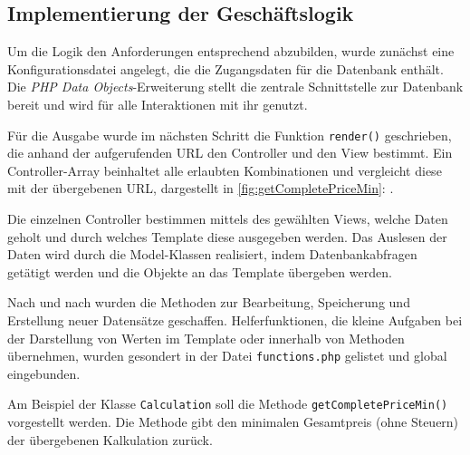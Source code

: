 \subsection{Implementierung der Geschäftslogik}
\label{sec:ImplementierungGeschaeftslogik}
Um die Logik den Anforderungen entsprechend abzubilden, wurde zunächst eine
Konfigurationsdatei angelegt, die die Zugangsdaten für die Datenbank enthält.
Die \textit{PHP Data Objects}-Erweiterung stellt die zentrale Schnittstelle
zur Datenbank bereit und wird für alle Interaktionen mit ihr genutzt.

Für die Ausgabe wurde im nächsten Schritt die Funktion \texttt{render()}
geschrieben, die anhand der aufgerufenden \acs{URL} den Controller und den View
bestimmt. Ein Controller-Array beinhaltet alle erlaubten Kombinationen und
vergleicht diese mit der übergebenen URL, dargestellt in
\ref{fig:getCompletePriceMin}: .

Die einzelnen Controller bestimmen mittels des gewählten Views, welche Daten
geholt und durch welches Template diese ausgegeben werden. Das Auslesen der
Daten wird durch die Model-Klassen realisiert, indem Datenbankabfragen getätigt
werden und die Objekte an das Template übergeben werden.

Nach und nach wurden die Methoden zur Bearbeitung, Speicherung und Erstellung
neuer Datensätze geschaffen. Helferfunktionen, die kleine Aufgaben bei der
Darstellung von Werten im Template oder innerhalb von Methoden übernehmen,
wurden gesondert in der Datei \texttt{functions.php} gelistet und global
eingebunden.

Am Beispiel der Klasse \texttt{Calculation} soll die Methode
\texttt{getCompletePriceMin()} vorgestellt werden. Die Methode gibt den
minimalen Gesamtpreis (ohne Steuern) der übergebenen Kalkulation zurück.

